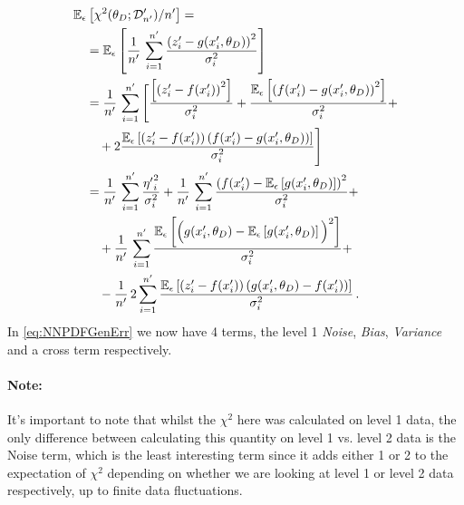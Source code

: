 \begin{align}
    & \mathbb{E}_{\epsilon}\left[\chi^2(\theta_D; \mathcal{D}'_{n'})/n'\right] = \nonumber\\
    & \quad = \mathbb{E}_{\epsilon}\left[
        \frac{1}{n'}\, \sum_{i=1}^{n'}
        \frac{\left(
            z'_i - g(x'_i,\theta_D)
        \right)^2}{\sigma_i^2}
    \right] \\
    & \quad = \frac{1}{n'}\, \sum_{i=1}^{n'} \Bigg[
        \frac{\left[
            \left(z'_i - f(x'_i)\right)^2
        \right]}{\sigma_i^2}
        + \frac{
            \mathbb{E}_{\epsilon}\left[\left(f(x'_i)-g(x'_i,\theta_D)\right)^2\right]
            }{\sigma_i^2} + \nonumber \\
    & \quad \quad + 2\frac{\mathbb{E}_{\epsilon}
    \left[
        \left(z'_i - f(x'_i)\right)\left(f(x'_i)-g(x'_i,\theta_D)\right)
    \right]}{\sigma_i^2}
    \Bigg] \\
    & \quad = \frac{1}{n'}\, \sum_{i=1}^{n'}
        \frac{{\eta'}_i^2}{\sigma_i^2} +
    \frac{1}{n'}\, \sum_{i=1}^{n'} \frac{
        \left(f(x'_i) - \mathbb{E}_{\epsilon}\left[g(x'_i,\theta_D)\right]\right)^2
        }{\sigma_i^2} + \nonumber \\
    & \quad \quad +
    \frac{1}{n'}\, \sum_{i=1}^{n'} \frac{
                \mathbb{E}_{\epsilon}\left[\Big(g(x'_i,\theta_D) -
                \mathbb{E}_{\epsilon}\left[g(x'_i,\theta_D)\right]\Big)^2\right]
            }{\sigma_i^2} + \nonumber \\
    & \quad \quad -
    \frac{1}{n'}\, 2 \sum_{i=1}^{n'} \frac{\mathbb{E}_{\epsilon}
        \left[
            \left(z'_i - f(x'_i)\right)\left(g(x'_i,\theta_D) - f(x'_i)\right)
        \right]}{\sigma_i^2} \, . \label{eq:NNPDFGenErr}
\end{align}
In \eqref{eq:NNPDFGenErr} we now have 4 terms, the level 1 {\em Noise},
{\em Bias}, {\em Variance} and a cross term respectively.

\paragraph[]{Note:} It's important to note that whilst the $\chi^2$ here was
calculated on level 1 data, the only difference between calculating this quantity
on level 1 vs. level 2 data is the Noise term, which is the least interesting
term since it adds either 1 or 2 to the expectation of $\chi^2$ depending on
whether we are looking at level 1 or level 2 data respectively, up to finite
data fluctuations.


